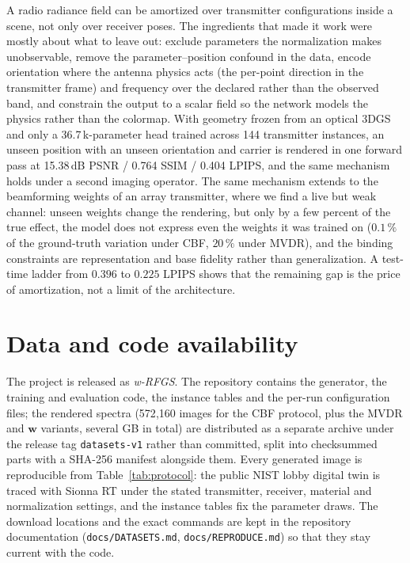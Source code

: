 \documentclass[conference]{IEEEtran}
\begin{document}
A radio radiance field can be amortized over transmitter configurations inside a
scene, not only over receiver poses. The ingredients that made it work were
mostly about what to leave out: exclude parameters the normalization makes
unobservable, remove the parameter--position confound in the data, encode
orientation where the antenna physics acts (the per-point direction in the
transmitter frame) and frequency over the declared rather than the observed
band, and constrain the output to a scalar field so the network models the
physics rather than the colormap. With geometry frozen from an optical 3DGS and
only a 36.7\,k-parameter head trained across 144 transmitter instances, an
unseen position with an unseen orientation and carrier is rendered in one
forward pass at 15.38\,dB PSNR / 0.764 SSIM / 0.404 LPIPS, and the same
mechanism holds under a second imaging operator. The same mechanism extends to
the beamforming weights of an array transmitter, where we find a live but weak
channel: unseen weights change the rendering, but only by a few percent of the
true effect, the model does not express even the weights it was trained on
($0.1\,\%$ of the ground-truth variation under CBF, $20\,\%$ under MVDR), and the
binding constraints are representation and base fidelity rather than
generalization. A test-time ladder from $0.396$ to $0.225$ LPIPS shows that the
remaining gap is the price of amortization, not a limit of the architecture.

\section*{Data and code availability}
\label{sec:avail}

The project is released as \emph{w-RFGS}. The repository contains the
generator, the training and evaluation code, the instance tables and the
per-run configuration files; the rendered spectra (572{,}160 images for the
CBF protocol, plus the MVDR and $\mathbf{w}$ variants, several GB in total) are
distributed as a separate archive under the release tag
\texttt{datasets-v1} rather than committed, split into checksummed parts with
a SHA-256 manifest alongside them. Every generated image is reproducible from
Table~\ref{tab:protocol}: the public NIST lobby digital twin is traced with
Sionna RT under the stated transmitter, receiver, material and normalization
settings, and the instance tables fix the parameter draws. The download
locations and the exact commands are kept in the repository documentation
(\texttt{docs/DATASETS.md}, \texttt{docs/REPRODUCE.md}) so that they stay
current with the code.



\end{document}

